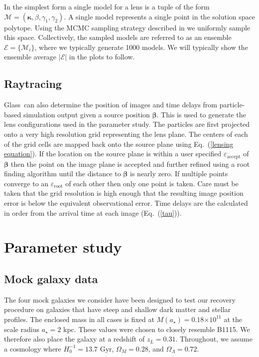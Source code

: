 \documentclass[onecolumn,galley]{mn2e}
\newcommand{\Glass}{{\sc Glass}}
\newcommand{\M}{\ensuremath{\mathscr{M}}}
\newcommand{\E}{\ensuremath{\mathscr{E}}}
\newcommand{\eps}{\ensuremath{\varepsilon}}
\newcommand{\eqnref}[1] {Eq.~(\ref{#1})}
\newcommand{\e}[1]{\ensuremath{\times 10^{#1}}}
\renewcommand{\vec}[1]{\ensuremath{\boldsymbol{#1}}}
\begin{document}
In the simplest form a single model for a lens is a tuple of the form
$\M = (\vec\kappa, \beta, \gamma_1, \gamma_2)$. A single model represents a 
single point in the solution space polytope. Using the MCMC sampling strategy
described in \cite{} we uniformly sample this space. Collectively, the sampled
models are referred to as an ensemble $\E = \{\M_i\}$, where we typically
generate 1000 models. We will typically show the ensemble average $|\E|$ in the
plots to follow.



\subsection{Raytracing}
\Glass\ can also determine the position of images and time delays from 
particle-based simulation output given a source position $\vec\beta$. This is
used to generate the lens configurations used in the parameter study.  The
particles are first projected onto a very high resolution grid representing the
lens plane. The centers of each of the grid cells are mapped back onto the
source plane using \eqnref{lensing equation}. If the location on the source
plane is within a user specified $\eps_\mathrm{accept}$ of $\vec\beta$ then the
point on the image plane is accepted and further refined using a root finding
algorithm until the distance to $\vec\beta$ is nearly zero. If multiple points
converge to an $\eps_\mathrm{root}$ of each other then only one point is taken.
Care must be taken that the grid resolution is high enough that the resulting
image position error is below the equivalent observational error. Time delays
are the calculated in order from the arrival time at each image (\eqnref{tau}).

\section{Parameter study}

\subsection{Mock galaxy data}

The four mock galaxies we consider have been designed to test our 
recovery procedure on galaxies that have steep and shallow dark matter
and stellar profiles. The enclosed mass in all cases is fixed at $M(a_\star)=
0.18\e{11}$ at the scale radius $a_\star=2$ kpc. These values were chosen to
closely resemble B1115. We therefore also place the galaxy at a redshift of
$z_L = 0.31$. Throughout, we assume a cosmology where $H_0^{-1}=13.7$ Gyr, $\Omega_M=0.28$,
and $\Omega_\Lambda=0.72$.
\end{document}
